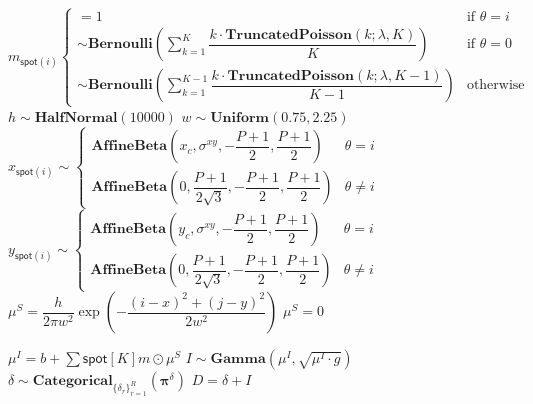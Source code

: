 \begin{algorithm}
\begin{algorithmic}[1]
            \State $ m_{\mathsf{spot}(i)}
                \begin{cases}
                    = 1 & \text{if $\theta = i$} \\
                    \sim \mathbf{Bernoulli} \left( \sum_{k=1}^K \dfrac{k \cdot \mathbf{TruncatedPoisson}(k; \lambda, K)}{K} \right) & \text{if $\theta = 0$} \\
                    \sim \mathbf{Bernoulli} \left( \sum_{k=1}^{K-1} \dfrac{k \cdot \mathbf{TruncatedPoisson}(k; \lambda, K-1)}{K-1} \right) & \text{otherwise}
                \end{cases} $
                \State $h \sim \textbf{HalfNormal}(10000)$
                \State $w \sim \textbf{Uniform}(0.75, 2.25)$
                \State $ x_{\mathsf{spot}(i)} \sim
                    \begin{cases}
                    \mathbf{AffineBeta}\left( x_c, \sigma^{xy}, -\dfrac{P+1}{2}, \dfrac{P+1}{2} \right) & \theta = i \\
                    \mathbf{AffineBeta}\left( 0, \dfrac{P+1}{2 \sqrt{3}}, -\dfrac{P+1}{2}, \dfrac{P+1}{2} \right) & \theta \neq i \end{cases} $
                \State $ y_{\mathsf{spot}(i)} \sim
                    \begin{cases}
                    \mathbf{AffineBeta}\left( y_c, \sigma^{xy}, -\dfrac{P+1}{2}, \dfrac{P+1}{2} \right) & \theta = i \\
                    \mathbf{AffineBeta}\left( 0, \dfrac{P+1}{2 \sqrt{3}}, -\dfrac{P+1}{2}, \dfrac{P+1}{2} \right) & \theta \neq i \end{cases}
                    $
                \State $\mu^{S} =
                            \dfrac{h}{2 \pi w^2} \exp{\left ( -\dfrac{(i-x)^2 + (j-y)^2}{2w^2} \right)}$
                \EndFor
                \State $\mu^S = 0$
            \EndIf
        \EndFor
            
            \State $\mu^I = b + \sum{\mathsf{spot}[K]} m \odot \mu^S$
            \State $I \sim \mathbf{Gamma} (\mu^I, \sqrt{\mu^I \cdot g})$
            \State $\delta \sim \mathbf{Categorical}_{\{ \delta_r \}^R_{r=1}}(\mathbf{\pi}^\delta)$
            \State \Return $D = \delta + I$
        \EndFor
    \EndFor
\EndFor
\end{algorithmic}
\end{algorithm}